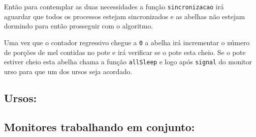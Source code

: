 \documentclass[12pt,a4paper]{article}
\begin{document}
Então para contemplar as duas necessidades a função \verb+sincronizacao+ irá aguardar que todos os processos estejam sincronizados e as abelhas não estejam dormindo para então prosseguir com o algoritmo.

Uma vez que o contador regressivo chegue a \verb+0+ a abelha irá incrementar o número de porções de mel contidas no pote e irá verificar se o pote esta cheio. Se o pote estiver cheio esta abelha chama a função \verb+allSleep+ e logo após \verb+signal+ do monitor urso para que um dos ursos seja acordado.

\subsection{Ursos:}

\subsection{Monitores trabalhando em conjunto:}
\end{document}
